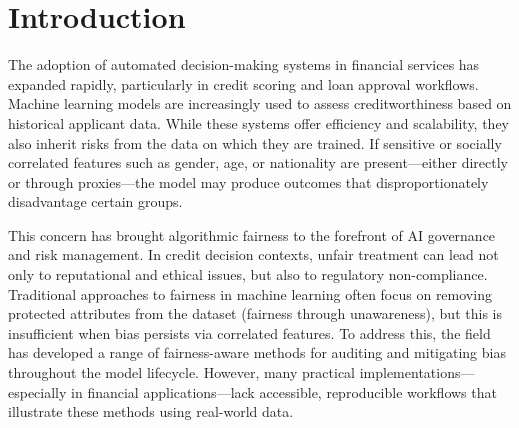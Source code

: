 \section{Introduction}

The adoption of automated decision-making systems in financial services has expanded rapidly, particularly in credit scoring and loan approval workflows. Machine learning models are increasingly used to assess creditworthiness based on historical applicant data. While these systems offer efficiency and scalability, they also inherit risks from the data on which they are trained. If sensitive or socially correlated features such as gender, age, or nationality are present—either directly or through proxies—the model may produce outcomes that disproportionately disadvantage certain groups.

This concern has brought algorithmic fairness to the forefront of AI governance and risk management. In credit decision contexts, unfair treatment can lead not only to reputational and ethical issues, but also to regulatory non-compliance. Traditional approaches to fairness in machine learning often focus on removing protected attributes from the dataset (fairness through unawareness), but this is insufficient when bias persists via correlated features. To address this, the field has developed a range of fairness-aware methods for auditing and mitigating bias throughout the model lifecycle. However, many practical implementations—especially in financial applications—lack accessible, reproducible workflows that illustrate these methods using real-world data.


